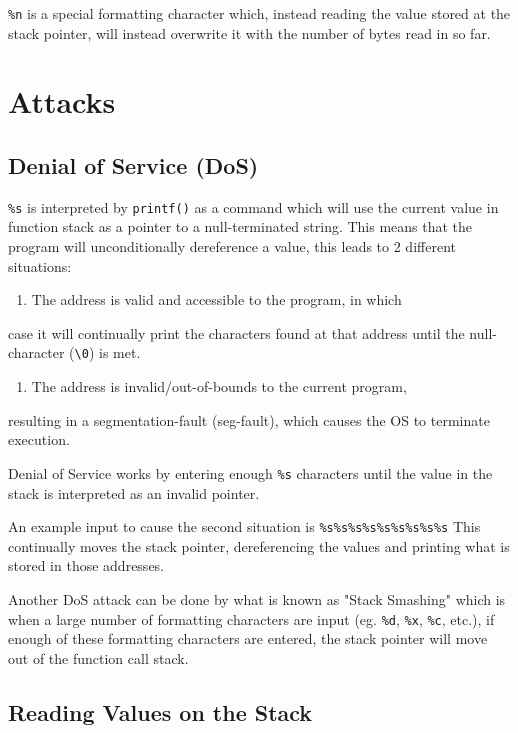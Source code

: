 \documentclass[11pt]{article}
\begin{document}
\texttt{\%n} is a special formatting character which, instead reading the
value stored at the stack pointer, will instead overwrite it with the
number of bytes read in so far.

\section{Attacks}
\label{sec:org9ee0fa2}

\subsection{Denial of Service (DoS)}
\label{sec:org4e51a0c}

\texttt{\%s} is interpreted by \texttt{printf()} as a command which will use the
current value in function stack as a pointer to a null-terminated
string. This means that the program will unconditionally dereference a
value, this leads to 2 different situations:

\begin{enumerate}
\item The address is valid and accessible to the program, in which
\end{enumerate}
case it will continually print the characters found at that address
until the null-character (\texttt{\textbackslash{}0}) is met.
\begin{enumerate}
\item The address is invalid/out-of-bounds to the current program,
\end{enumerate}
resulting in a segmentation-fault (seg-fault), which causes the OS to
terminate execution.

Denial of Service works by entering enough \texttt{\%s} characters until the
value in the stack is interpreted as an invalid pointer.

An example input to cause the second situation is \texttt{\%s\%s\%s\%s\%s\%s\%s\%s\%s}
This continually moves the stack pointer, dereferencing the values and
printing what is stored in those addresses.

Another DoS attack can be done by what is known as "Stack Smashing"
which is when a large number of formatting characters are input
(eg. \texttt{\%d}, \texttt{\%x}, \texttt{\%c}, etc.), if enough of these formatting characters are
entered, the stack pointer will move out of the function call stack.

\subsection{Reading Values on the Stack}
\label{sec:orgfc65fb7}
\end{document}
